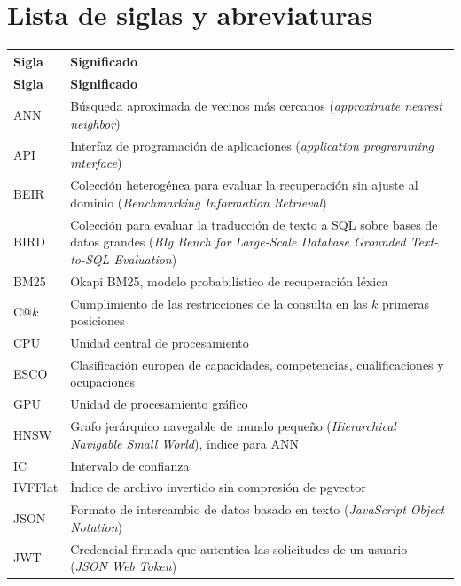 \chapter*{Lista de siglas y abreviaturas}

{\renewcommand{\arraystretch}{1.25}
\begin{longtable}[l]{>{\raggedright\arraybackslash}p{2.2cm}>{\raggedright\arraybackslash}p{12cm}}
\textbf{Sigla} & \textbf{Significado} \\[0.5ex] \hline
\endfirsthead
\textbf{Sigla} & \textbf{Significado} \\[0.5ex] \hline
\endhead
ANN & Búsqueda aproximada de vecinos más cercanos (\textit{approximate nearest neighbor}) \\
API & Interfaz de programación de aplicaciones (\textit{application programming interface}) \\
BEIR & Colección heterogénea para evaluar la recuperación sin ajuste al dominio (\textit{Benchmarking Information Retrieval}) \\
BIRD & Colección para evaluar la traducción de texto a SQL sobre bases de datos grandes (\textit{BIg Bench for Large-Scale Database Grounded Text-to-SQL Evaluation}) \\
BM25 & Okapi BM25, modelo probabilístico de recuperación léxica \\
C@$k$ & Cumplimiento de las restricciones de la consulta en las $k$ primeras posiciones \\
CPU & Unidad central de procesamiento \\
ESCO & Clasificación europea de capacidades, competencias, cualificaciones y ocupaciones \\
GPU & Unidad de procesamiento gráfico \\
HNSW & Grafo jerárquico navegable de mundo pequeño (\textit{Hierarchical Navigable Small World}), índice para ANN \\
IC & Intervalo de confianza \\
IVFFlat & Índice de archivo invertido sin compresión de pgvector \\
JSON & Formato de intercambio de datos basado en texto (\textit{JavaScript Object Notation}) \\
JWT & Credencial firmada que autentica las solicitudes de un usuario (\textit{JSON Web Token}) \\

\end{longtable}}
